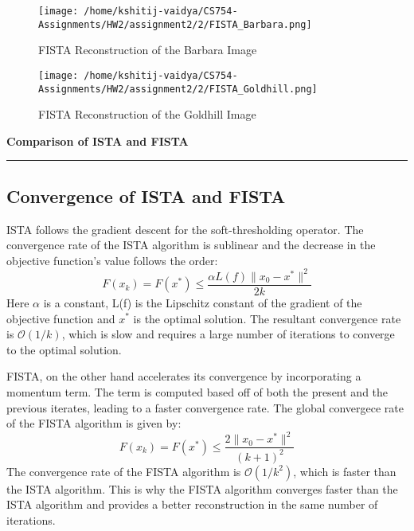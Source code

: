 \documentclass[a4paper,12pt]{article}
\newenvironment{solution}[2][]{%
    \begin{mdframed}[linecolor=blue!70!black, linewidth=2pt, roundcorner=10pt, backgroundcolor=yellow!10!white, skipabove=12pt, skipbelow=12pt]%
        \textbf{\large #2}
        \par\noindent\rule{\textwidth}{0.4pt}
}{
    \end{mdframed}
}
\begin{document}
\begin{figure}[!htbp]
  \centering
  \texttt{[image: /home/kshitij-vaidya/CS754-Assignments/HW2/assignment2/2/FISTA\_Barbara.png]}
  \caption{FISTA Reconstruction of the Barbara Image}
\end{figure}

\begin{figure}[!htbp]
  \centering
  \texttt{[image: /home/kshitij-vaidya/CS754-Assignments/HW2/assignment2/2/FISTA\_Goldhill.png]}
  \caption{FISTA Reconstruction of the Goldhill Image}
\end{figure}


\begin{solution}{Comparison of ISTA and FISTA}
  \subsection{Convergence of ISTA and FISTA}
  ISTA follows the gradient descent for the soft-thresholding operator. The convergence rate of the ISTA algorithm is sublinear and the decrease in the objective function's value follows the order:
  \begin{equation}
    F(x_k) = F(x^*) \leq \displaystyle\frac{\alpha L(f)\|x_0 - x^*\|^2}{2k}
  \end{equation}
  \noindent Here $\alpha$ is a constant, L(f) is the Lipschitz constant of the gradient of the objective function and $x^*$ is the optimal solution. The resultant convergence rate is $\mathcal{O}(1/k)$, which is slow and requires a large number of iterations to converge to the optimal solution.

  \noindent FISTA, on the other hand accelerates its convergence by incorporating a momentum term. The term is computed based off of both the present and the previous iterates, leading to a faster convergence rate. The global convergece rate of the FISTA algorithm is given by:
  \begin{equation}
    F(x_k) = F(x^*) \leq \displaystyle\frac{2\|x_0 - x^*\|^2}{(k+1)^2}
  \end{equation}
  \noindent The convergence rate of the FISTA algorithm is $\mathcal{O}(1/k^2)$, which is faster than the ISTA algorithm. This is why the FISTA algorithm converges faster than the ISTA algorithm and provides a better reconstruction in the same number of iterations.


\end{solution}
\end{document}
